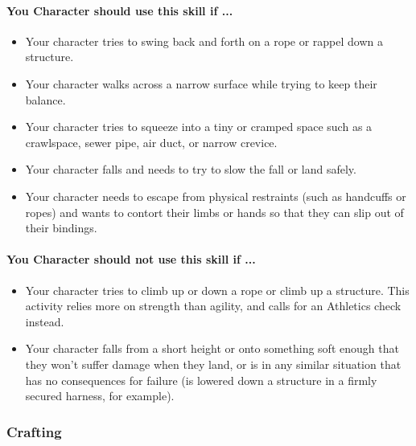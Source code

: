\begin{multicols}{2}
\paragraph{You Character should use this skill if ...}
\begin{itemize}
    \item Your character tries to swing back and forth on a rope or rappel down
        a structure.
    \item Your character walks across a narrow surface while trying to keep their
        balance.
    \item Your character tries to squeeze into a tiny or cramped space such as a
        crawlspace, sewer pipe, air duct, or narrow crevice.
    \item Your character falls and needs to try to slow the fall or land safely.
    \item Your character needs to escape from physical restraints (such as
        handcuffs or ropes) and wants to contort their limbs or hands so that they
        can slip out of their bindings.
\end{itemize}
\paragraph{You Character should not use this skill if ...}
\begin{itemize}
    \item Your character tries to climb up or down a rope or climb up a structure.
        This activity relies more on strength than agility, and calls for an
        Athletics check instead.
    \item Your character falls from a short height or onto something soft enough
        that they won't suffer damage when they land, or is in any similar
        situation that has no consequences for failure (is lowered down a structure
        in a firmly secured harness, for example).
\end{itemize}

\subsubsection{Crafting}\label{skill:crafting}

\end{multicols}
